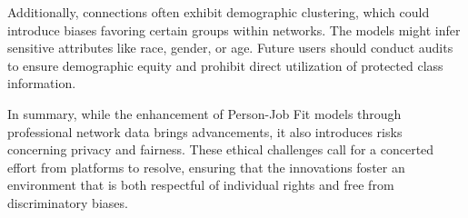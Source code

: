 Additionally, connections often exhibit demographic clustering, which could introduce biases favoring certain groups within networks. The models might infer sensitive attributes like race, gender, or age. Future users should conduct audits to ensure demographic equity and prohibit direct utilization of protected class information.

In summary, while the enhancement of Person-Job Fit models through professional network data brings advancements, it also introduces risks concerning privacy and fairness. These ethical challenges call for a concerted effort from platforms to resolve, ensuring that the innovations foster an environment that is both respectful of individual rights and free from discriminatory biases.
